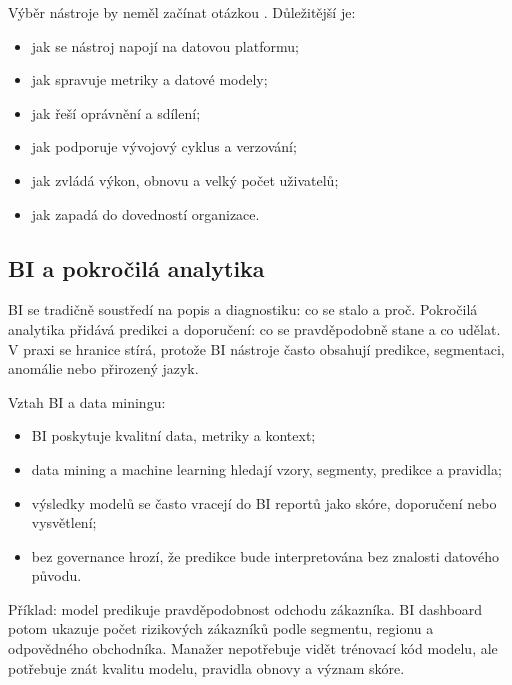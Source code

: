 Výběr nástroje by neměl začínat otázkou . Důležitější je:
\begin{itemize}
  \item jak se nástroj napojí na datovou platformu;
  \item jak spravuje metriky a datové modely;
  \item jak řeší oprávnění a sdílení;
  \item jak podporuje vývojový cyklus a verzování;
  \item jak zvládá výkon, obnovu a velký počet uživatelů;
  \item jak zapadá do dovedností organizace.
\end{itemize}

\subsection{BI a pokročilá analytika}
BI se tradičně soustředí na popis a diagnostiku: co se stalo a proč. Pokročilá analytika přidává predikci a doporučení: co se pravděpodobně stane a co udělat. V praxi se hranice stírá, protože BI nástroje často obsahují predikce, segmentaci, anomálie nebo přirozený jazyk.

Vztah BI a data miningu:
\begin{itemize}
  \item BI poskytuje kvalitní data, metriky a kontext;
  \item data mining a machine learning hledají vzory, segmenty, predikce a pravidla;
  \item výsledky modelů se často vracejí do BI reportů jako skóre, doporučení nebo vysvětlení;
  \item bez governance hrozí, že predikce bude interpretována bez znalosti datového původu.
\end{itemize}

Příklad: model predikuje pravděpodobnost odchodu zákazníka. BI dashboard potom ukazuje počet rizikových zákazníků podle segmentu, regionu a odpovědného obchodníka. Manažer nepotřebuje vidět trénovací kód modelu, ale potřebuje znát kvalitu modelu, pravidla obnovy a význam skóre.

